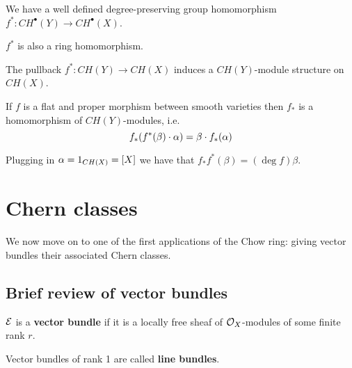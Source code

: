 \begin{corollary}[]
We have a well defined degree-preserving group homomorphism $f^\ast:CH^\bullet(Y)\to CH^\bullet(X)$.
\end{corollary}

\begin{remark}
$f^\ast$ is also a ring homomorphism.
\end{remark}


\begin{remark}
The pullback $f^\ast:CH(Y)\to CH(X)$ induces a $CH(Y)$-module structure on $CH(X)$.
\end{remark}



\begin{proposition}
If $f$ is a flat and proper morphism between smooth varieties then $f_\ast$ is a homomorphism of $CH(Y)$-modules, i.e.
\[f_\ast(f^\ast(\beta)\cdot \alpha)=\beta\cdot f_\ast(\alpha)\]
\end{proposition}


\begin{remark}
Plugging in $\alpha=1_{CH(X)}=[X]$ we have that $f_\ast f^\ast(\beta)=(\deg f)\beta$.
\end{remark}















\section{Chern classes}
We now move on to one of the first applications of the Chow ring: giving vector bundles their associated Chern classes.

\subsection{Brief review of vector bundles}
\begin{definition}[]
$\mathcal{E}$ is a \textbf{vector bundle} if it is a locally free sheaf of $\mathcal{O}_X$-modules of some finite rank $r$.
\end{definition}

\begin{remark}
Vector bundles of rank 1 are called \textbf{line bundles}.
\end{remark}


